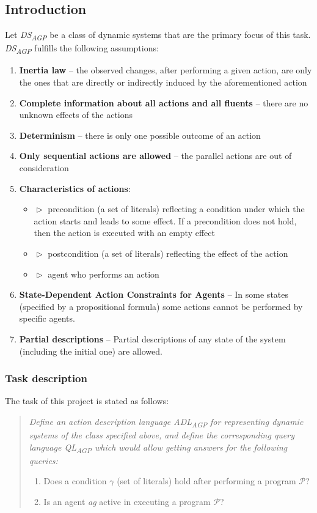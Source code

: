 \documentclass[a4paper]{article}
\begin{document}
\subsection{Introduction}
Let \emph{DS\textsubscript{AGP}} be a class of dynamic systems that are the primary focus of this task. \emph{DS\textsubscript{AGP}} fulfills the following assumptions: 
\begin{enumerate}[label=A{{\arabic*}}., leftmargin=*]
    \item \textbf{Inertia law} -- the observed changes, after performing a given action, are only the ones that are directly or indirectly induced by the aforementioned action 
    \item \textbf{Complete information about all actions and all fluents} -- there are no unknown effects of the actions 
    \item \textbf{Determinism} -- there is only one possible outcome of an action 
    \item \textbf{Only sequential actions are allowed} -- the parallel actions are out of consideration 
    \item \textbf{Characteristics of actions}:
        \begin{itemize}
            \item[] $\vartriangleright$ precondition (a set of literals) reflecting a condition under which the action starts and leads to some effect. If a precondition does not hold, then the action is executed with an empty effect
            \item[] $\vartriangleright$ postcondition (a set of literals) reflecting the effect of the action
            \item[] $\vartriangleright$ agent who performs an action
        \end{itemize}
    \item \textbf{State-Dependent Action Constraints for Agents} -- In some states (specified by a propositional formula) some actions cannot be performed by specific agents. 
    \item \textbf{Partial descriptions} -- Partial descriptions of any state of the system (including the initial one) are allowed.
\end{enumerate}
\subsubsection{Task description}
The task of this project is stated as follows:
\begin{quote}
\itshape
Define an action description language \emph{ADL\textsubscript{AGP}} for representing dynamic systems of the class specified above, and define the corresponding query language \emph{QL\textsubscript{AGP}} which would allow getting answers for the following queries:
\begin{enumerate}[label=Q{{\arabic*}}.]
    \item Does a condition $\gamma$ (set of literals) hold after performing a program $\mathcal{P}$?
    \item Is an agent \textit{ag} active in executing a program $\mathcal{P}$?
\end{enumerate}
\end{quote}
%
\end{document}
